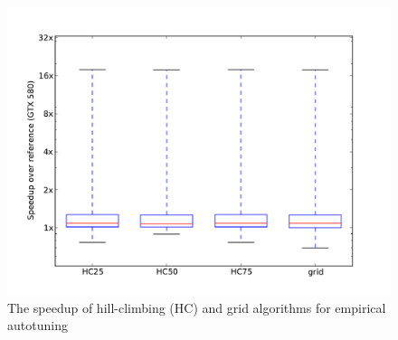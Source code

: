 \documentclass{sig-alternate}
\begin{document}
\begin{figure}
\centering
\includegraphics[scale=.42]{fig_genX_munctional0_580.pdf}
\caption{The speedup of hill-climbing (HC) and grid algorithms for empirical autotuning}
\label{fig:speedup}
\end{figure}
\end{document}
